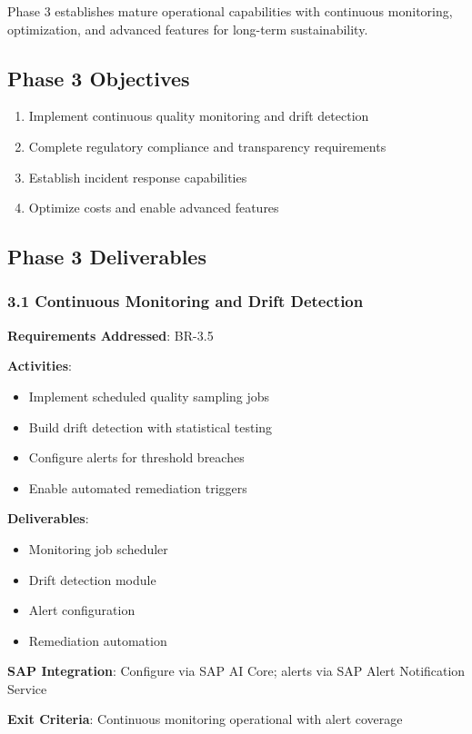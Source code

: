 \documentclass[12pt,a4paper,twoside]{report}
\begin{document}
Phase 3 establishes mature operational capabilities with continuous monitoring,
optimization, and advanced features for long-term sustainability.

\subsection{Phase 3 Objectives}

\begin{enumerate}
\item Implement continuous quality monitoring and drift detection
\item Complete regulatory compliance and transparency requirements
\item Establish incident response capabilities
\item Optimize costs and enable advanced features
\end{enumerate}

\subsection{Phase 3 Deliverables}

\subsubsection{3.1 Continuous Monitoring and Drift Detection}

\begin{tcolorbox}[colback=orange!5,colframe=orange!70,title=3.1 Quality Monitoring]
\textbf{Requirements Addressed}: BR-3.5

\textbf{Activities}:
\begin{itemize}
\item Implement scheduled quality sampling jobs
\item Build drift detection with statistical testing
\item Configure alerts for threshold breaches
\item Enable automated remediation triggers
\end{itemize}

\textbf{Deliverables}:
\begin{itemize}
\item Monitoring job scheduler
\item Drift detection module
\item Alert configuration
\item Remediation automation
\end{itemize}

\textbf{SAP Integration}: Configure via SAP AI Core; alerts via SAP Alert
Notification Service

\textbf{Exit Criteria}: Continuous monitoring operational with alert coverage
\end{tcolorbox}
\end{document}
